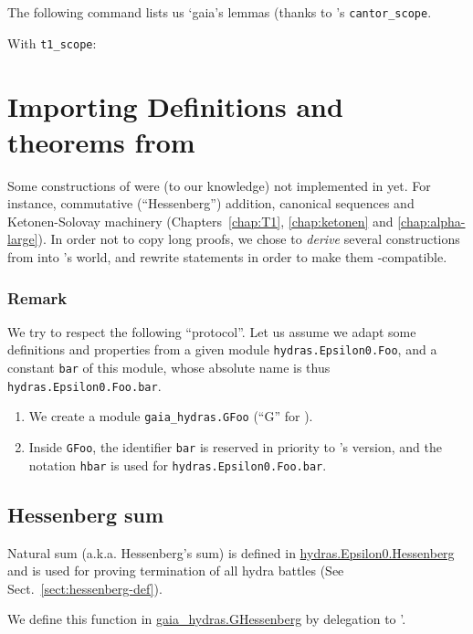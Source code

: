 The following command lists us `gaia's lemmas (thanks to
\gaia's  \texttt{cantor\_scope}.

With \texttt{t1\_scope}:


\section{Importing Definitions and theorems from \HydrasLib}

Some constructions of \HydrasLib were (to our knowledge) not implemented in \gaia yet. For instance, commutative (``Hessenberg'') addition, canonical sequences and Ketonen-Solovay machinery (Chapters~\ref{chap:T1}, \ref{chap:ketonen} and \ref{chap:alpha-large}). In order not to copy long proofs, we chose to
\emph{derive} several constructions from \HydrasLib into \gaia's world, and rewrite \HydrasLib statements in order to make them \gaia-compatible.


\subsubsection{Remark}
\label{sect:gaia-masking}
We try to respect the following ``protocol''.
Let us assume we adapt some definitions and properties
from a given module \texttt{hydras.Epsilon0.Foo}, and a constant \texttt{bar} of this module, whose absolute name is
thus \texttt{hydras.Epsilon0.Foo.bar}.
\begin{enumerate}
\item We create a module \texttt{gaia\_hydras.GFoo}
  (``G'' for \gaia).
\item Inside \texttt{GFoo}, the identifier \texttt{bar}
  is reserved in priority to \gaia's version, and the notation
  \texttt{hbar} is used for \texttt{hydras.Epsilon0.Foo.bar}.
\end{enumerate}

\subsection{Hessenberg sum}

Natural sum  (a.k.a. Hessenberg's  sum) is defined in
\href{../theories/html/hydras.Epsilon0.Hessenberg.html}{hydras.Epsilon0.Hessenberg} and is used for proving termination of all hydra battles (See Sect.~\ref{sect:hessenberg-def}).

We define this function in \href{../theories/html/gaia\_hydras.GHessenberg.html}{gaia\_hydras.GHessenberg} by delegation to \HydrasLib'.

